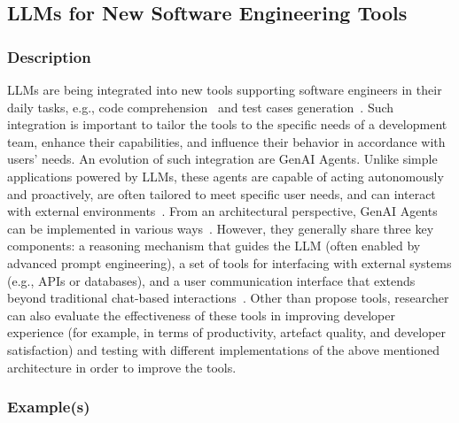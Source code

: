 \subsection{LLMs for New Software Engineering Tools}
\label{sec:llms-for-new-software-engineering-tools}

\subsubsection{Description}

LLMs are being integrated into new tools supporting software engineers in their daily tasks, e.g., code comprehension~\cite{DBLP:conf/chi/YanHWH24} and test cases generation~\cite{DBLP:journals/tse/SchaferNET24}.
Such integration is important to tailor the tools to the specific needs of a development team, enhance their capabilities, and influence their behavior in accordance with users' needs.
An evolution of such integration are GenAI Agents.
Unlike simple applications powered by LLMs, these agents are capable of acting autonomously and proactively, are often tailored to meet specific user needs, and can interact with external environments~\cite{takerngsaksiri2024human,wiesinger2025agents}.
From an architectural perspective, GenAI Agents can be implemented in various ways~\cite{wiesinger2025agents}. However, they generally share three key components: a reasoning mechanism that guides the LLM (often enabled by advanced prompt engineering), a set of tools for interfacing with external systems (e.g., APIs or databases), and a user communication interface that extends beyond traditional chat-based interactions~\cite{DBLP:conf/icsm/RichardsW24, DBLP:journals/tmlr/SumersYN024, DBLP:journals/corr/abs-2309-07870}.
Other than propose tools, researcher can also evaluate the effectiveness of these tools in improving developer experience (for example, in terms of productivity, artefact quality, and developer satisfaction) and testing with different implementations of the above mentioned architecture in order to improve the tools.

\subsubsection{Example(s)}

